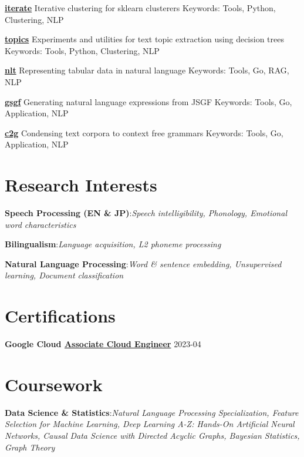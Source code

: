 \documentclass[a4paper,9pt]{extarticle}
\begin{document}
\noindent
\textbf{\href{https://github.com/ryancahildebrandt/iterate}{iterate}}
Iterative clustering for sklearn clusterers
Keywords: Tools, Python, Clustering, NLP

\noindent
\textbf{\href{https://github.com/ryancahildebrandt/topics}{topics}}
Experiments and utilities for text topic extraction using decision trees
Keywords: Tools, Python, Clustering, NLP

\noindent
\textbf{\href{https://github.com/ryancahildebrandt/nlt}{nlt}}
Representing tabular data in natural language
Keywords: Tools, Go, RAG, NLP

\noindent
\textbf{\href{https://github.com/ryancahildebrandt/gsgf}{gsgf}}
Generating natural language expressions from JSGF
Keywords: Tools, Go, Application, NLP

\noindent
\textbf{\href{https://github.com/ryancahildebrandt/c2g}{c2g}}
Condensing text corpora to context free grammars
Keywords: Tools, Go, Application, NLP





\section*{Research Interests}

\noindent
\textbf{Speech Processing (EN \& JP)}:\textit{Speech intelligibility, Phonology, Emotional word characteristics}

\noindent
\textbf{Bilingualism}:\textit{Language acquisition, L2 phoneme processing}

\noindent
\textbf{Natural Language Processing}:\textit{Word \& sentence embedding, Unsupervised learning, Document classification}




\section*{Certifications}

\noindent
\textbf{Google Cloud \href{https://google.accredible.com/d3ef369f-9c2c-486a-bda6-943a74f70dff}{Associate Cloud Engineer}} \hfill 2023-04




\section*{Coursework}

\noindent
\textbf{Data Science \& Statistics}:\textit{Natural Language Processing Specialization, Feature Selection for Machine Learning, Deep Learning A-Z: Hands-On Artificial Neural Networks, Causal Data Science with Directed Acyclic Graphs, Bayesian Statistics, Graph Theory}
\end{document}
